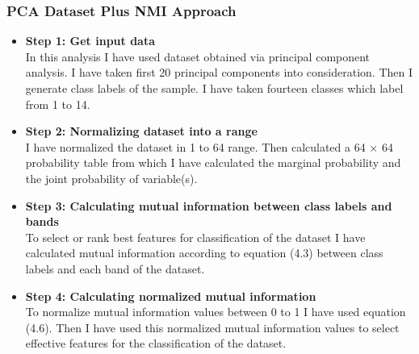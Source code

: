 \documentclass[document.tex]{subfiles}
\begin{document}
\subsubsection{PCA Dataset Plus NMI Approach}
\begin{itemize}
	\item \textbf{Step 1: Get input data}\\
	In this analysis I have used dataset obtained via principal component analysis. I have taken first 20 principal components into consideration. Then I generate class labels of the sample. I have taken
	fourteen classes which label from 1 to 14.
	\item \textbf{Step 2: Normalizing dataset into a range}\\
	I have normalized the dataset in 1 to 64 range. Then calculated a 64 $\times$ 64 probability table from which I have calculated the marginal probability and the joint probability of variable(s). 
	\item \textbf{Step 3: Calculating mutual information between class labels and bands}\\
	To select or rank best features for classification of the dataset I have calculated mutual information according to equation (4.3) between class labels and each band of the dataset.
	\item \textbf{Step 4: Calculating normalized mutual information}\\
	To normalize mutual information values between 0 to 1 I have used equation (4.6). Then I have used this normalized mutual information values to select effective features for the classification of the dataset. 
\end{itemize}
\end{document}
